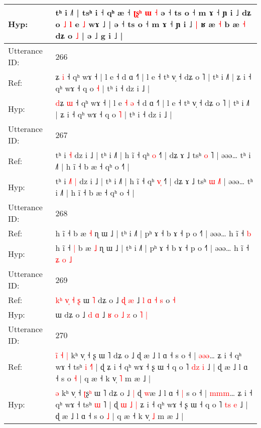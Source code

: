 \documentclass[10pt]{article}
\DeclareRobustCommand{\hl}[1]{{\textcolor{red}{#1}}}
\begin{document}
\begin{longtable}{ll}
 \\
Hyp: & tʰ i ˩˥ | tsʰ i ˧ qʰ æ ˧ \hl{ʈ}\hl{ʂ}\hl{ʰ} \hl{ɯ} \hl{˧} ə ˧ ts o ˧ m ɤ ˧ ɲ i ˩\hl{}\hl{} dʑ o \hl{˩} \hl{l} e\hl{}\hl{} \hl{˩} wɤ ˩\hl{} | ə ˧ ts o ˧ m ɤ ˧ ɲ i ˩\hl{ }\hl{|} ʁ æ \hl{˧} b æ\hl{}\hl{} \hl{˧} dʑ o \hl{˩} | ə ˩ g i ˩ |
 \\
\midrule
Utterance ID: & 266 \\
Ref: & \hl{}ʑ \hl{i} ˧ qʰ wɤ ˧ | l e\hl{}\hl{}\hl{}\hl{} ˧ d ɑ ˧˥ | l e ˧ tʰ v̩ ˧ dʑ o ˥ | tʰ i ˩˥ | ʑ i ˧ qʰ wɤ ˧ q o \hl{˧} | tʰ i ˧ dz i ˩ |
 \\
Hyp: & \hl{d}ʑ \hl{ɯ} ˧ qʰ wɤ ˧ | l e\hl{ }\hl{˧}\hl{ }\hl{ə} ˧ d ɑ ˧˥ | l e ˧ tʰ v̩ ˧ dʑ o ˥ | tʰ i ˩˥ | ʑ i ˧ qʰ wɤ ˧ q o \hl{˥} | tʰ i ˧ dz i ˩ |
 \\
\midrule
Utterance ID: & 267 \\
Ref: & tʰ i\hl{}\hl{}\hl{} \hl{˧} dz i ˩ | tʰ i ˩˥ | h ĩ ˧ qʰ \hl{}\hl{o} ˧˥ | dʑ ɤ ˩ tsʰ \hl{o} \hl{}˥ | əəə… tʰ i ˩˥ | h ĩ ˧ b æ ˧ qʰ o ˧\hl{˥} |
 \\
Hyp: & tʰ i\hl{ }\hl{˩}\hl{˥} \hl{|} dz i ˩ | tʰ i ˩˥ | h ĩ ˧ qʰ \hl{v}\hl{̩} ˧˥ | dʑ ɤ ˩ tsʰ \hl{ɯ} \hl{˩}˥ | əəə… tʰ i ˩˥ | h ĩ ˧ b æ ˧ qʰ o ˧\hl{} |
 \\
\midrule
Utterance ID: & 268 \\
Ref: & h ĩ ˧\hl{}\hl{} b æ \hl{˧} ɳ ɯ ˩ | tʰ i ˩˥ | pʰ ɤ ˧ b ɤ ˧ p o ˧˥ | əəə… h ĩ ˧\hl{}\hl{}\hl{}\hl{} \hl{b}
 \\
Hyp: & h ĩ ˧\hl{ }\hl{|} b æ \hl{˩} ɳ ɯ ˩ | tʰ i ˩˥ | pʰ ɤ ˧ b ɤ ˧ p o ˧˥ | əəə… h ĩ ˧\hl{ }\hl{ʑ}\hl{ }\hl{o} \hl{˩}
 \\
\midrule
Utterance ID: & 269 \\
Ref: & \hl{k}\hl{ʰ}\hl{ }\hl{v}\hl{̩}\hl{ }\hl{˧}\hl{ }\hl{ʂ}\hl{ }ɯ\hl{ }\hl{˥} dʑ o ˩ \hl{ɖ} \hl{æ} ˩ \hl{l} \hl{ɑ} \hl{˧} \hl{s} o\hl{}\hl{} \hl{˧}
 \\
Hyp: & \hl{}\hl{}\hl{}\hl{}\hl{}\hl{}\hl{}\hl{}\hl{}\hl{}ɯ\hl{}\hl{} dʑ o ˩ \hl{d} \hl{ɑ} ˩ \hl{ʁ} \hl{o} \hl{˩} \hl{z} o\hl{ }\hl{˥} \hl{|}
 \\
\midrule
Utterance ID: & 270 \\
Ref: & \hl{i}\hl{̃}\hl{ }\hl{˧}\hl{ }\hl{|} kʰ v̩ ˧ \hl{}ʂ\hl{} ɯ ˥ dʑ o ˩\hl{}\hl{} ɖ \hl{}æ ˩ l ɑ ˧\hl{}\hl{} s o ˧ | \hl{ə}\hl{ə}\hl{ə}… ʑ i ˧ qʰ wɤ ˧ tsʰ \hl{i} \hl{˧}˥ | ɖ\hl{}\hl{}\hl{}\hl{}\hl{}\hl{} ʑ i ˧ qʰ wɤ ˧ ʂ ɯ ˧ q o ˥ \hl{d}\hl{z} \hl{i} ˩ | ɖ æ ˩ l ɑ ˧ s o \hl{˧} | q æ ˧ k v̩ \hl{˥} m æ ˩ |
 \\
Hyp: & \hl{}\hl{}\hl{}\hl{}\hl{}\hl{ə} kʰ v̩ ˧ \hl{ʈ}ʂ\hl{ʰ} ɯ ˥ dʑ o ˩\hl{ }\hl{|} ɖ \hl{w}æ ˩ l ɑ ˧\hl{ }\hl{|} s o ˧ | \hl{m}\hl{m}\hl{m}… ʑ i ˧ qʰ wɤ ˧ tsʰ \hl{ɯ} \hl{}˥ | ɖ\hl{ }\hl{ɯ}\hl{ }\hl{˩}\hl{ }\hl{|} ʑ i ˧ qʰ wɤ ˧ ʂ ɯ ˧ q o ˥ \hl{t}\hl{s} \hl{e} ˩ | ɖ æ ˩ l ɑ ˧ s o \hl{˩} | q æ ˧ k v̩ \hl{˩} m æ ˩ |

\end{longtable}
\end{document}
